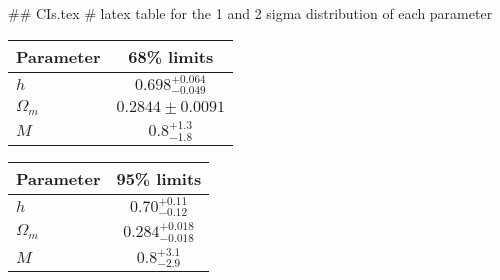 ## CIs.tex
# latex table for the 1 and 2 sigma distribution of each parameter

\begin{tabular} { l  c}
 Parameter &  68\% limits\\
\hline
{\boldmath$h              $} & $0.698^{+0.064}_{-0.049}   $\\
{\boldmath$\Omega_m       $} & $0.2844\pm 0.0091          $\\
{\boldmath$M              $} & $0.8^{+1.3}_{-1.8}         $\\
\hline
\end{tabular}

\begin{tabular} { l  c}
 Parameter &  95\% limits\\
\hline
{\boldmath$h              $} & $0.70^{+0.11}_{-0.12}      $\\
{\boldmath$\Omega_m       $} & $0.284^{+0.018}_{-0.018}   $\\
{\boldmath$M              $} & $0.8^{+3.1}_{-2.9}         $\\
\hline
\end{tabular}
